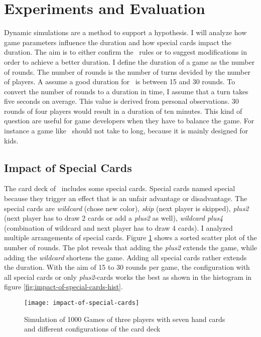 
\section{Experiments and Evaluation}

Dynamic simulations are a method to support a hypothesis. I will analyze how game parameters influence the duration and how special cards impact the duration. The aim is to either confirm the \uno\ rules or to suggest modifications in order to achieve a better duration. I define the duration of a game as the number of rounds. The number of rounds is the number of turns devided by the number of players.  A assume a good duration for \uno\ is between 15 and 30 rounds. To convert the number of rounds to a duration in time, I assume that a turn takes five seconds on average. This value is derived from personal observations. 30 rounds of four players would result in a duration of ten minutes.
This kind of question are useful for game developers when they have to balance the game. For instance a game like \uno\ should not take to long, because it is mainly designed for kids.


\subsection{Impact of Special Cards}

The card deck of \uno\ includes some special cards. Special cards named special because they trigger an effect that is an unfair advantage or disadvantage. The special cards are \textit{wildcard} (chose new color), \textit{skip} (next player is skipped), \textit{plus2} (next player has to draw 2 cards or add a \textit{plus2} as well), \textit{wildcard plus4} (combination of wildcard and next player has to draw 4 cards). I analyzed multiple arrangements of special cards. Figure \ref{fig:impact-of-special-cards} shows a sorted scatter plot of the number of rounds. The plot reveals that adding the \textit{plus2} extends the game, while adding the \textit{wildcard} shortens the game. Adding all special cards rather extends the duration. With the aim of 15 to 30 rounds per game, the configuration with all special cards or only \textit{plus2}-cards works the best as shown in the histogram in figure \ref{fig:impact-of-special-cards-hist}.

\begin{figure}[h!]
  \caption{Simulation of 1000 Games of three players with seven hand cards and different configurations of the card deck}
  \centering
  \texttt{[image: impact-of-special-cards]}
  \label{fig:impact-of-special-cards}
\end{figure}



